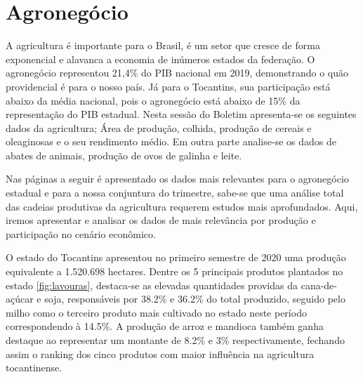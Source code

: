 \chapter{Agronegócio}
\par A agricultura é importante para o Brasil, é um setor que cresce de forma exponencial e alavanca a economia de inúmeros estados da federação. O agronegócio representou 21,4\% do PIB nacional em 2019, demonstrando o quão providencial é para o nosso país. Já para o Tocantins, sua participação está abaixo da média nacional, pois o agronegócio está abaixo de 15\% da representação do PIB estadual. Nesta sessão do Boletim apresenta-se os seguintes dados da agricultura; Área de produção, colhida, produção de cereais e oleaginosas e o seu rendimento médio. Em outra parte analise-se os dados de abates de animais, produção de ovos de galinha e leite. 
\par Nas páginas a seguir é apresentado os dados mais relevantes para o agronegócio estadual e para a nossa conjuntura do trimestre, sabe-se que uma análise total das cadeias produtivas da agricultura requerem estudos mais aprofundados. Aqui, iremos apresentar e analisar os dados de mais relevância por produção e participação no cenário econômico.

\par O estado do Tocantins apresentou no primeiro semestre de 2020 uma produção  equivalente a 1.520.698 hectares. Dentre os 5 principais produtos plantados no estado \ref{fig:lavouras}, destaca-se as elevadas quantidades providas da cana-de-açúcar e soja, responsáveis por 38.2\% e 36.2\% do total produzido, seguido pelo milho como o terceiro produto mais cultivado no estado neste período correspondendo à 14.5\%. A produção de arroz e mandioca também ganha destaque ao representar um montante de 8.2\% e 3\% respectivamente, fechando assim o ranking dos cinco produtos com maior influência na agricultura tocantinense. 

